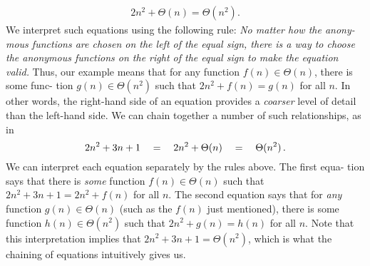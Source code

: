 \documentclass{report}
\begin{document}
        \begin{align*}
            2n^{2} + \Theta(n) = \Theta(n^{2})
        .\end{align*}
        \bigbreak \noindent 
        We interpret such equations using the following rule: \textit{No matter how the anony-
            mous functions are chosen on the left of the equal sign, there is a way to choose 
        the anonymous functions on the right of the equal sign to make the equation valid.}
        Thus, our example means that for any function $f(n) \in \Theta(n)$, there is some func-
        tion $g(n) \in \Theta(n^2)$ such that $2n^2 + f(n) = g(n)$ for all $n$. In other words, the 
        right-hand side of an equation provides a \textit{coarser} level of detail than the left-hand 
        side.
        We can chain together a number of such relationships, as in
        \[
            2n^2 + 3n + 1 \quad = \quad 2n^2 + \Theta(n) \\
            \quad = \quad \Theta(n^2) \, .
        \]
        We can interpret each equation separately by the rules above. The first equa-
        tion says that there is \textit{some} function $f(n) \in \Theta(n)$ such that $2n^2 + 3n + 1 = 
        2n^2 + f(n)$ for all $n$. The second equation says that for \textit{any} function $g(n) \in \Theta(n)$ 
        (such as the $f(n)$ just mentioned), there is some function $h(n) \in \Theta(n^2)$ such 
        that $2n^2 + g(n) = h(n)$ for all $n$. Note that this interpretation implies that 
        $2n^2 + 3n + 1 = \Theta(n^2)$, which is what the chaining of equations intuitively gives 
        us.




        \bigbreak \noindent 
\end{document}
